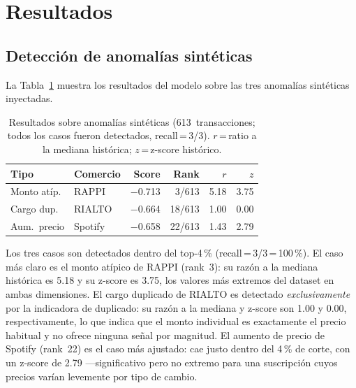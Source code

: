 \documentclass[conference]{IEEEtran}
\begin{document}
\section{Resultados}
\label{sec:resultados}

\subsection{Detecci\'on de anomal\'ias sint\'eticas}

La Tabla~\ref{tab:eval-results} muestra los resultados del modelo sobre las tres
anomal\'ias sint\'eticas inyectadas.

\begin{table}[h]
\caption{Resultados sobre anomal\'ias sint\'eticas (613~transacciones;
  todos los casos fueron detectados, recall\,=\,3/3).
  $r$\,=\,ratio a la mediana hist\'orica; $z$\,=\,z-score hist\'orico.}
\label{tab:eval-results}
\centering
\begin{tabular}{p{1.7cm}p{1.1cm}rrrr}
\toprule
\textbf{Tipo} & \textbf{Comercio} & \textbf{Score} & \textbf{Rank} & \textbf{$r$} & \textbf{$z$} \\
\midrule
Monto at\'ip.  & RAPPI   & $-$0.713 & 3/613  & 5.18 & 3.75 \\
Cargo dup.     & RIALTO  & $-$0.664 & 18/613 & 1.00 & 0.00 \\
Aum.\ precio   & Spotify & $-$0.658 & 22/613 & 1.43 & 2.79 \\
\bottomrule
\end{tabular}
\end{table}

Los tres casos son detectados dentro del top-4\,\% (recall\,=\,3/3\,=\,100\,\%).
El caso m\'as claro es el monto at\'ipico de RAPPI (rank~3): su raz\'on a la
mediana hist\'orica es 5.18 y su z-score es 3.75, los valores m\'as extremos del
dataset en ambas dimensiones. El cargo duplicado de RIALTO es detectado
\emph{exclusivamente} por la indicadora de duplicado: su raz\'on a la mediana y
z-score son 1.00 y 0.00, respectivamente, lo que indica que el monto individual
es exactamente el precio habitual y no ofrece ninguna se\~nal por magnitud. El
aumento de precio de Spotify (rank~22) es el caso m\'as ajustado: cae justo dentro
del 4\,\% de corte, con un z-score de 2.79 ---significativo pero no extremo para
una suscripci\'on cuyos precios var\'ian levemente por tipo de cambio.
\end{document}
